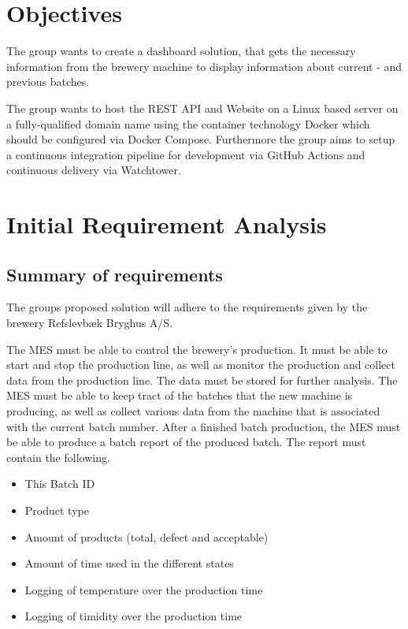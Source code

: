 \section{Objectives}
The group wants to create a dashboard solution, that gets the necessary
information from the brewery machine to display information about current - and
previous batches.

The group wants to host the REST API and Website on a Linux based server on a
fully-qualified domain name using the container technology Docker which should
be configured via Docker Compose. Furthermore the group aims to setup a
continuous integration pipeline for development via GitHub Actions and
continuous delivery via Watchtower.

\section{Initial Requirement Analysis}


\subsection{Summary of requirements}
The groups proposed solution will adhere to the requirements given by the brewery Refslevbæk Bryghus A/S.

The MES must be able to control the brewery’s production.
It must be able to start and stop the production line,
as well as monitor the production and collect data from the production line.
The data must be stored for further analysis.
The MES must be able to keep tract of the batches that the new machine is producing,
as well as collect various data from the machine that is associated with the current batch number.
After a finished batch production, the MES must be able to produce a batch report of the produced batch.
The report must contain the following. \\

\begin{itemize}
    \item This Batch ID
    \item Product type
    \item Amount of products (total, defect and acceptable)
    \item Amount of time used in the different states
    \item Logging of temperature over the production time
    \item Logging of timidity over the production time
\end{itemize}

